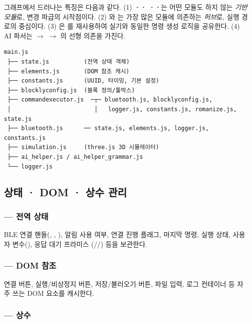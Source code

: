 그래프에서 드러나는 특징은 다음과 같다. (1) \textbf{·}\textbf{·}
\textbf{·}\textbf{·}는 어떤 모듈도
 하지 않는 \emph{기반 모듈}로, 변경 파급의 시작점이다. (2)
와 는 가장 많은 모듈에 의존하는
\emph{허브}로, 실행 경로의 중심이다. (3) 은 를
재사용하여 실기와 동일한 명령 생성 로직을 공유한다. (4) AI 파서는
 $\to$  $\to$ 의
선형 의존을 가진다.

\begin{verbatim}
main.js
 ├── state.js          (전역 상태 객체)
 ├── elements.js       (DOM 참조 캐시)
 ├── constants.js      (UUID, 타이밍, 기본 설정)
 ├── blocklyconfig.js  (블록 정의/툴박스)
 ├── commandexecutor.js  ─┬─ bluetooth.js, blocklyconfig.js,
 │                        │   logger.js, constants.js, romanize.js, state.js
 ├── bluetooth.js      ── state.js, elements.js, logger.js, constants.js
 ├── simulation.js     (three.js 3D 시뮬레이터)
 ├── ai_helper.js / ai_helper_grammar.js
 └── logger.js
\end{verbatim}

\subsection{상태 \textbf{·} DOM \textbf{·} 상수 관리}

\subsubsection{ --- 전역 상태}

BLE 연결 핸들(, ,
), 알림 사용 여부, 연결 진행 플래그, 마지막 명령,
실행 상태, 사용자 변수(), 응답 대기 프라미스
(//) 등을 보관한다.

\subsubsection{ --- DOM 참조}

연결 버튼, 실행/비상정지 버튼, 저장/불러오기 버튼, 파일 입력, 로그 컨테이너
등 자주 쓰는 DOM 요소를 캐시한다.

\subsubsection{ --- 상수}

